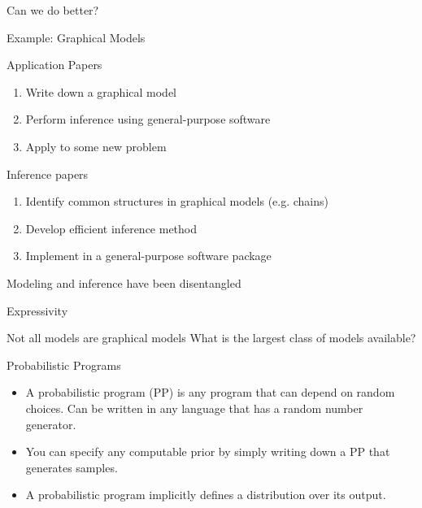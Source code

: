 \begin{frame}{Can we do better?}
  \begin{block}{Example: Graphical Models}  
  \end{block}
      \begin{block}{Application Papers}
      \begin{enumerate}
        \item Write down a graphical model
        \item Perform inference using general-purpose software
        \item Apply to some new problem
      \end{enumerate}
    \end{block}
      \begin{block}{Inference papers}
      \begin{enumerate}
        \item Identify common structures in graphical models (e.g. chains)
        \item Develop efficient inference method
        \item Implement in a general-purpose software package
      \end{enumerate}
    \end{block}  
  \begin{block}{}
      \vspace{-2\baselineskip}
  \large
    \begin{center}
    {
      {Modeling and inference have been disentangled}
    }	
    \end{center}
  \end{block}
\end{frame}



\begin{frame}{Expressivity}
  \begin{block}{Not all models are graphical models}  
  What is the largest class of models available?
  \end{block}
  \vspace{\baselineskip}
  \begin{block}{Probabilistic Programs}
      \begin{itemize}
        \item A probabilistic program (PP) is any program that can depend on random choices.  Can be written in any language that has a random number generator.
        \item You can specify any computable prior by simply writing down a PP that generates samples.
        \item A probabilistic program implicitly defines a distribution over its output.
      \end{itemize}
    \end{block}
\end{frame}

